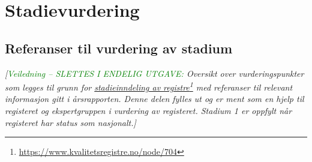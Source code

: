 \documentclass[norsk, a4paper, twocolumn]{report}
\newcommand{\newtext}[1]{\cbstart\textcolor{green}{#1\cbend}}
\newcommand{\guide}[1] {
	\textit{[\textcolor{guidegray}{\newtext{Veiledning -- SLETTES I ENDELIG
	UTGAVE:} #1}]}
	}
\begin{document}
\part{Stadievurdering}


\chapter{Referanser til vurdering av stadium}
\guide{Oversikt over vurderingspunkter som legges til grunn for
\href{https://www.kvalitetsregistre.no/node/704}{stadieinndeling av registre}\footnote{\url{https://www.kvalitetsregistre.no/node/704}}
med referanser til relevant informasjon
gitt i årsrapporten. Denne delen fylles ut og er ment som en
hjelp til registeret og ekspertgruppen i vurdering av registeret. Stadium 1
er oppfylt når registeret har status som nasjonalt.}

\bigskip
\bigskip
\end{document}
